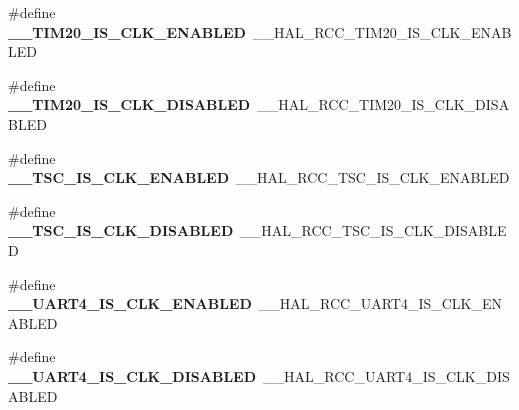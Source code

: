 \begin{DoxyCompactItemize}
\item 
\#define {\bfseries \+\_\+\+\_\+\+T\+I\+M20\+\_\+\+I\+S\+\_\+\+C\+L\+K\+\_\+\+E\+N\+A\+B\+L\+ED}~\+\_\+\+\_\+\+H\+A\+L\+\_\+\+R\+C\+C\+\_\+\+T\+I\+M20\+\_\+\+I\+S\+\_\+\+C\+L\+K\+\_\+\+E\+N\+A\+B\+L\+ED\hypertarget{group___h_a_l___r_c_c___aliased_ga295f0f8b21ce49903a7cf27a7185f8c5}{}\label{group___h_a_l___r_c_c___aliased_ga295f0f8b21ce49903a7cf27a7185f8c5}

\item 
\#define {\bfseries \+\_\+\+\_\+\+T\+I\+M20\+\_\+\+I\+S\+\_\+\+C\+L\+K\+\_\+\+D\+I\+S\+A\+B\+L\+ED}~\+\_\+\+\_\+\+H\+A\+L\+\_\+\+R\+C\+C\+\_\+\+T\+I\+M20\+\_\+\+I\+S\+\_\+\+C\+L\+K\+\_\+\+D\+I\+S\+A\+B\+L\+ED\hypertarget{group___h_a_l___r_c_c___aliased_ga4507c4cdece09b9b9819081d451cd1c9}{}\label{group___h_a_l___r_c_c___aliased_ga4507c4cdece09b9b9819081d451cd1c9}

\item 
\#define {\bfseries \+\_\+\+\_\+\+T\+S\+C\+\_\+\+I\+S\+\_\+\+C\+L\+K\+\_\+\+E\+N\+A\+B\+L\+ED}~\+\_\+\+\_\+\+H\+A\+L\+\_\+\+R\+C\+C\+\_\+\+T\+S\+C\+\_\+\+I\+S\+\_\+\+C\+L\+K\+\_\+\+E\+N\+A\+B\+L\+ED\hypertarget{group___h_a_l___r_c_c___aliased_ga688b5814881327ab38b80de587427a83}{}\label{group___h_a_l___r_c_c___aliased_ga688b5814881327ab38b80de587427a83}

\item 
\#define {\bfseries \+\_\+\+\_\+\+T\+S\+C\+\_\+\+I\+S\+\_\+\+C\+L\+K\+\_\+\+D\+I\+S\+A\+B\+L\+ED}~\+\_\+\+\_\+\+H\+A\+L\+\_\+\+R\+C\+C\+\_\+\+T\+S\+C\+\_\+\+I\+S\+\_\+\+C\+L\+K\+\_\+\+D\+I\+S\+A\+B\+L\+ED\hypertarget{group___h_a_l___r_c_c___aliased_ga26cfc13289aa205af204bcb46b4e6ed6}{}\label{group___h_a_l___r_c_c___aliased_ga26cfc13289aa205af204bcb46b4e6ed6}

\item 
\#define {\bfseries \+\_\+\+\_\+\+U\+A\+R\+T4\+\_\+\+I\+S\+\_\+\+C\+L\+K\+\_\+\+E\+N\+A\+B\+L\+ED}~\+\_\+\+\_\+\+H\+A\+L\+\_\+\+R\+C\+C\+\_\+\+U\+A\+R\+T4\+\_\+\+I\+S\+\_\+\+C\+L\+K\+\_\+\+E\+N\+A\+B\+L\+ED\hypertarget{group___h_a_l___r_c_c___aliased_ga37af363ea4a9ef8343ff19ebc2ac15c3}{}\label{group___h_a_l___r_c_c___aliased_ga37af363ea4a9ef8343ff19ebc2ac15c3}

\item 
\#define {\bfseries \+\_\+\+\_\+\+U\+A\+R\+T4\+\_\+\+I\+S\+\_\+\+C\+L\+K\+\_\+\+D\+I\+S\+A\+B\+L\+ED}~\+\_\+\+\_\+\+H\+A\+L\+\_\+\+R\+C\+C\+\_\+\+U\+A\+R\+T4\+\_\+\+I\+S\+\_\+\+C\+L\+K\+\_\+\+D\+I\+S\+A\+B\+L\+ED\hypertarget{group___h_a_l___r_c_c___aliased_gaa11f06c9b2c1c950e217e551c9bb24c4}{}\label{group___h_a_l___r_c_c___aliased_gaa11f06c9b2c1c950e217e551c9bb24c4}


\end{DoxyCompactItemize}
